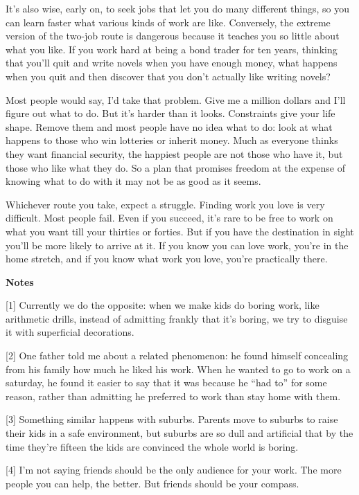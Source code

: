 It's also wise, early on, to seek jobs that let you do many different
things, so you can learn faster what various kinds of work are like.
Conversely, the extreme version of the two-job route is dangerous
because it teaches you so little about what you like. If you work hard
at being a bond trader for ten years, thinking that you'll quit and
write novels when you have enough money, what happens when you quit and
then discover that you don't actually like writing novels?

Most people would say, I'd take that problem. Give me a million dollars
and I'll figure out what to do. But it's harder than it looks.
Constraints give your life shape. Remove them and most people have no
idea what to do: look at what happens to those who win lotteries or
inherit money. Much as everyone thinks they want financial security, the
happiest people are not those who have it, but those who like what they
do. So a plan that promises freedom at the expense of knowing what to do
with it may not be as good as it seems.

Whichever route you take, expect a struggle. Finding work you love is
very difficult. Most people fail. Even if you succeed, it's rare to be
free to work on what you want till your thirties or forties. But if you
have the destination in sight you'll be more likely to arrive at it. If
you know you can love work, you're in the home stretch, and if you know
what work you love, you're practically there.

\textbf{Notes}

{[}1{]} Currently we do the opposite: when we make kids do boring work,
like arithmetic drills, instead of admitting frankly that it's boring,
we try to disguise it with superficial decorations.

{[}2{]} One father told me about a related phenomenon: he found himself
concealing from his family how much he liked his work. When he wanted to
go to work on a saturday, he found it easier to say that it was because
he ``had to'' for some reason, rather than admitting he preferred to
work than stay home with them.

{[}3{]} Something similar happens with suburbs. Parents move to suburbs
to raise their kids in a safe environment, but suburbs are so dull and
artificial that by the time they're fifteen the kids are convinced the
whole world is boring.

{[}4{]} I'm not saying friends should be the only audience for your
work. The more people you can help, the better. But friends should be
your compass.

